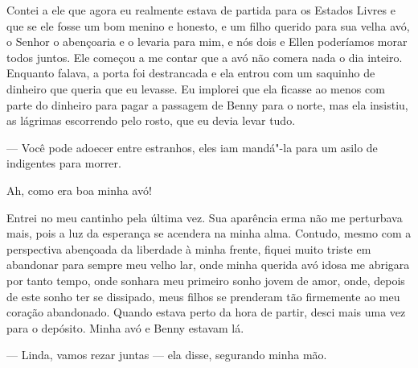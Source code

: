 
Contei a ele que agora eu realmente
estava de partida para os Estados Livres e que se ele fosse um bom
menino e honesto, e um filho querido para sua velha avó, o Senhor o
abençoaria e o levaria para mim, e nós dois e Ellen poderíamos morar
todos juntos. Ele começou a me contar que a avó não comera nada o dia
inteiro. Enquanto falava, a porta foi destrancada e ela entrou com um
saquinho de dinheiro que queria que eu levasse. Eu implorei que ela
ficasse ao menos com parte do dinheiro para pagar a passagem de Benny
para o norte, mas ela insistiu, as lágrimas escorrendo pelo rosto, que
eu devia levar tudo.

--- Você pode adoecer entre estranhos, eles iam mandá"-la para um asilo
de indigentes para morrer.

Ah, como era boa minha avó!

Entrei no meu cantinho pela última vez.
Sua aparência erma não me perturbava mais, pois a luz da esperança se
acendera na minha alma. Contudo, mesmo com a perspectiva abençoada da
liberdade à minha frente, fiquei muito triste em abandonar para sempre
meu velho lar, onde minha querida avó idosa me abrigara por tanto tempo,
onde sonhara meu primeiro sonho jovem de amor, onde, depois de este
sonho ter se dissipado, meus filhos se prenderam tão firmemente ao meu
coração abandonado. Quando estava perto da hora de partir, desci mais
uma vez para o depósito. Minha avó e Benny estavam lá.

--- Linda, vamos rezar juntas --- ela disse, segurando minha mão.

